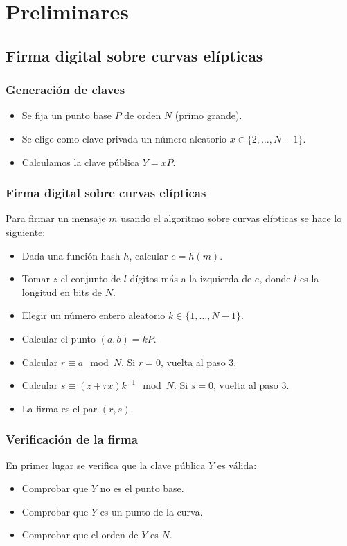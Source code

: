 \documentclass{beamer}
\theoremstyle{definition}
\begin{document}
\section{Preliminares}
\subsection{Firma digital sobre curvas elípticas}
\begin{frame}
\frametitle{Generación de claves}
\begin{itemize}
	\item<1-> Se fija un punto base $P$ de orden $N$ (primo grande).
	\item<2-> Se elige como clave privada un número aleatorio $x\in\{2,\dots, N-1\}$.
	\item<3-> Calculamos la clave pública $Y=xP$.
\end{itemize}


\end{frame} 

\begin{frame}
	\frametitle{Firma digital sobre curvas elípticas}
	Para firmar un mensaje $m$ usando el algoritmo sobre curvas elípticas se hace lo siguiente:
\begin{itemize}
	\item<2-> Dada una función hash $h$, calcular $e=h(m)$.
	\item<3-> Tomar $z$ el conjunto de $l$ dígitos más a la izquierda de $e$, donde $l$ es la longitud en bits de $N$.
	\item<4-> Elegir un número entero aleatorio $k\in\{1,\dots,N-1\}$.
	\item<5-> Calcular el punto $(a,b)=kP$.
	\item<6-> Calcular $r\equiv a\mod N$. Si $r=0$, vuelta al paso 3.
	\item<7-> Calcular $s\equiv (z+rx)k^{-1}\mod N$. Si $s=0$, vuelta al paso 3. 
	\item<8-> La firma es el par $(r,s)$.
\end{itemize}
\end{frame}

\begin{frame}
\frametitle{Verificación de la firma}
En primer lugar se verifica que la clave pública $Y$ es válida:
\begin{itemize}
	\item<2-> Comprobar que $Y$ no es el punto base.
	\item<3-> Comprobar que $Y$ es un punto de la curva.
	\item<4-> Comprobar que el orden de $Y$ es $N$.
\end{itemize} 
\end{frame}
\end{document}
